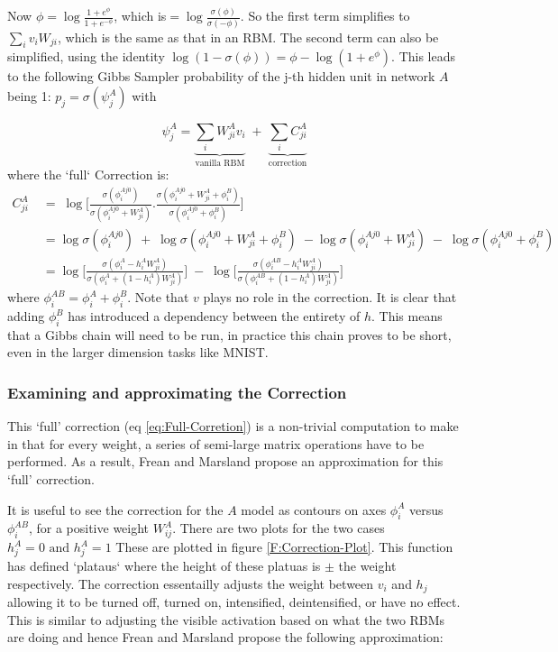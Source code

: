 Now $\phi = \log \frac{1+e^{\phi}}{1+e^{-\phi}}$, which is$ = \log \frac{\sigma(\phi)}{\sigma(-\phi)}$.
So the first term simplifies to
$ \sum_i v_i W_{ji}$, which is the same as that in an RBM. The second term can also be simplified, using the identity $\log(1-\sigma(\phi)) = \phi - \log(1+e^\phi)$. This leads to the following Gibbs Sampler probability of the j-th hidden unit in network $A$ being 1: $p_j = \sigma(\psi_j^A)$ with

$$
\psi_j^A = \underbrace{\sum_i W^A_{ji} v_i}_\text{vanilla RBM} \; + \; \underbrace{\sum_i C^A_{ji}}_\text{correction} $$
where the `full` Correction is:
\begin{equation}\label{eq:Full-Corretion}
\begin{aligned}
C^A_{ji} \; &= \;\log \bigg[ \frac{\sigma (\phi_i^{Aj0})}{\sigma (\phi_i^{Aj0} + W^A_{ji})} . \frac{\sigma (\phi_i^{Aj0} + W_{ji}^A + \phi_i^B) }{\sigma (\phi_i^{Aj0} + \phi_i^B)} \bigg]
\\
&= \log \sigma(\phi_i^{Aj0})  \; + \; \log \sigma (\phi_i^{Aj0} + W^A_{ji} + \phi_i^B) \;- \log \sigma (\phi_i^{Aj0} + W^A_{ji})  \; - \; \log \sigma ( \phi_i^{Aj0} + \phi_i^B)
\\
&= \log \bigg[ \frac{\sigma(\phi_i^{A} - h^A_i W^A_{ji})}{\sigma (\phi_i^{A} + (1-h^A_i) W^A_{ji})} \bigg]  \; - \; \log \bigg[ \frac{ \sigma ( \phi_i^{AB} - h^A_i W^A_{ji})}{\sigma (\phi_i^{AB} + (1-h^A_i) W^A_{ji})} \bigg]
\end{aligned}
\end{equation}
where $\phi_i^{AB} = \phi_i^{A} + \phi_i^{B}$. Note that $v$ plays no role in the correction. It is clear that adding $\phi^B_i$ has introduced a dependency between the entirety of $h$. This means that a Gibbs chain will need to be run, in practice this chain proves to be short, even in the larger dimension tasks like MNIST.

\subsubsection{Examining and approximating the Correction}

This `full' correction (eq \ref{eq:Full-Corretion}) is a non-trivial computation to make in that for every weight, a series of semi-large matrix operations have to be performed. As a result, Frean and Marsland propose an approximation for this `full' correction.

It is useful to see the correction for the $A$ model as contours on axes $\phi^A_i$ versus $\phi^{AB}_i$, for a positive weight $W^A_{ij}$.
There are two plots for the two cases $h^A_j=0 \text{ and } h^A_j = 1$ These are plotted in figure \ref{F:Correction-Plot}. This function has defined `plataus` where the height of these platuas is $\pm $ the weight respectively. The correction essentailly adjusts the weight between $v_i$ and $h_j$ allowing it to be turned off, turned on, intensified, deintensified, or have no effect. This is similar to adjusting the visible activation based on what the two RBMs are doing and hence Frean and Marsland propose the following approximation:

